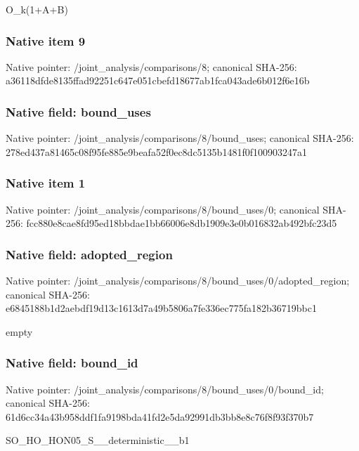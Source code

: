 \documentclass[10pt,a4paper]{article}
\begin{document}
\begingroup\raggedright\sloppy O\_\allowbreak{}k(1+A+B)\par\endgroup

\subsubsection{Native item 9}
Native pointer: /joint\_\allowbreak{}analysis/comparisons/8; canonical SHA-256: a36118dfde8135ffad92251c647e051cbefd18677ab1fca043ade6b012f6e16b

\subsubsection{Native field: bound\_\allowbreak{}uses}
Native pointer: /joint\_\allowbreak{}analysis/comparisons/8/bound\_\allowbreak{}uses; canonical SHA-256: 278ed437a81465c08f95fe885e9beafa52f0ec8dc5135b1481f0f100903247a1

\subsubsection{Native item 1}
Native pointer: /joint\_\allowbreak{}analysis/comparisons/8/bound\_\allowbreak{}uses/0; canonical SHA-256: fcc880e8cae8fd95ed18bbdae1bb66006e8db1909e3e0b016832ab492bfc23d5

\subsubsection{Native field: adopted\_\allowbreak{}region}
Native pointer: /joint\_\allowbreak{}analysis/comparisons/8/bound\_\allowbreak{}uses/0/adopted\_\allowbreak{}region; canonical SHA-256: e6845188b1d2aebdf19d13c1613d7a49b5806a7fe336ec775fa182b36719bbc1

\begingroup\raggedright\sloppy empty\par\endgroup

\subsubsection{Native field: bound\_\allowbreak{}id}
Native pointer: /joint\_\allowbreak{}analysis/comparisons/8/bound\_\allowbreak{}uses/0/bound\_\allowbreak{}id; canonical SHA-256: 61d6cc34a43b958ddf1fa9198bda41fd2e5da92991db3bb8e8c76f8f93f370b7

\begingroup\raggedright\sloppy SO\_\allowbreak{}HO\_\allowbreak{}HON05\_\allowbreak{}S\_\allowbreak{}\_\allowbreak{}deterministic\_\allowbreak{}\_\allowbreak{}b1\par\endgroup
\end{document}
